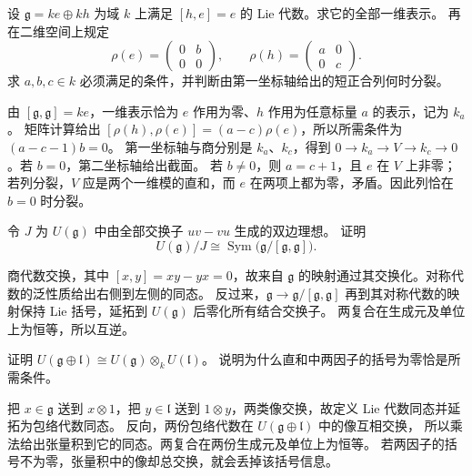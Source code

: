 \begin{exercise}\label{b5:ex:15-one-dimensional-characters}
	设 \(\mathfrak g=ke\oplus kh\) 为域 \(k\) 上满足 \([h,e]=e\) 的 Lie 代数。求它的全部一维表示。 再在二维空间上规定
	\[
		\rho(e)=\begin{pmatrix}0&b\\0&0\end{pmatrix},\qquad
		\rho(h)=\begin{pmatrix}a&0\\0&c\end{pmatrix}.
	\]
	求 \(a,b,c\in k\) 必须满足的条件，并判断由第一坐标轴给出的短正合列何时分裂。
\end{exercise}
\begin{solution}
	由 \([\mathfrak g,\mathfrak g]=ke\)，一维表示恰为 \(e\) 作用为零、\(h\) 作用为任意标量 \(a\) 的表示，记为 \(k_a\)。 矩阵计算给出 \([\rho(h),\rho(e)]=(a-c)\rho(e)\)，所以所需条件为 \((a-c-1)b=0\)。 第一坐标轴与商分别是 \(k_a\)、\(k_c\)，得到 \(0\to k_a\to V\to k_c\to0\)。若 \(b=0\)，第二坐标轴给出截面。 若 \(b\ne0\)，则 \(a=c+1\)，且 \(e\) 在 \(V\) 上非零；若列分裂，\(V\) 应是两个一维模的直和，而 \(e\) 在两项上都为零，矛盾。因此列恰在 \(b=0\) 时分裂。
\end{solution}

\begin{exercise}\label{b5:ex:15-enveloping-abelianization}
	令 \(J\) 为 \(U(\mathfrak g)\) 中由全部交换子 \(uv-vu\) 生成的双边理想。 证明
	\[
		U(\mathfrak g)/J\cong\operatorname{Sym}\bigl(\mathfrak g/[\mathfrak g,\mathfrak g]\bigr).
	\]
\end{exercise}
\begin{solution}
	商代数交换，其中 \([x,y]=xy-yx=0\)，故来自 \(\mathfrak g\) 的映射通过其交换化。对称代数的泛性质给出右侧到左侧的同态。 反过来，\(\mathfrak g\to\mathfrak g/[\mathfrak g,\mathfrak g]\) 再到其对称代数的映射保持 Lie 括号，延拓到 \(U(\mathfrak g)\) 后零化所有结合交换子。 两复合在生成元及单位上为恒等，所以互逆。
\end{solution}

\begin{exercise}\label{b5:ex:15-direct-sum-enveloping}
	证明 \(U(\mathfrak g\oplus\mathfrak l)\cong U(\mathfrak g)\otimes_kU(\mathfrak l)\)。 说明为什么直和中两因子的括号为零恰是所需条件。
\end{exercise}
\begin{solution}
	把 \(x\in\mathfrak g\) 送到 \(x\otimes1\)，把 \(y\in\mathfrak l\) 送到 \(1\otimes y\)，两类像交换，故定义 Lie 代数同态并延拓为包络代数同态。 反向，两份包络代数在 \(U(\mathfrak g\oplus\mathfrak l)\) 中的像互相交换， 所以乘法给出张量积到它的同态。两复合在两份生成元及单位上为恒等。 若两因子的括号不为零，张量积中的像却总交换，就会丢掉该括号信息。
\end{solution}

